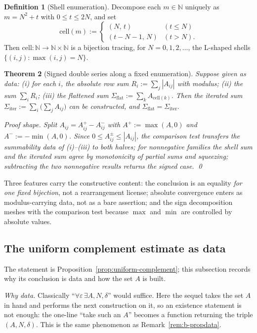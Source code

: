 \documentclass[11pt]{article}
\newtheorem{theorem}{Theorem}[section]
\theoremstyle{definition}
\newtheorem{definition}[theorem]{Definition}
\theoremstyle{remark}
\begin{document}
\begin{definition}[Shell enumeration]
\label{def:b-shell}
Decompose each $m\in\mathbb{N}$ uniquely as $m=N^2+t$ with $0\le t\le 2N$, and set
\[
\mathrm{cell}(m):=\begin{cases}(N,\,t)&(t\le N)\\(t-N-1,\,N)&(t>N).\end{cases}
\]
Then $\mathrm{cell}:\mathbb{N}\to\mathbb{N}\times\mathbb{N}$ is a bijection tracing, for $N=0,1,2,\dots$, the L-shaped shells $\{(i,j):\max(i,j)=N\}$.
\end{definition}

\begin{theorem}[Signed double series along a fixed enumeration]
\label{thm:b-fubini}
Suppose given \emph{as data}: (i) for each $i$, the absolute row sum $R_i:=\sum_j |A_{ij}|$ with modulus; (ii) the sum $\sum_i R_i$; (iii) the flattened sum $\Sigma_{\mathrm{flat}}:=\sum_k A_{\mathrm{cell}(k)}$.  Then the iterated sum $\Sigma_{\mathrm{iter}}:=\sum_i\bigl(\sum_j A_{ij}\bigr)$ can be constructed, and
\(
\Sigma_{\mathrm{flat}}=\Sigma_{\mathrm{iter}} .
\)

\emph{Proof shape.}  Split $A_{ij}=A^+_{ij}-A^-_{ij}$ with $A^+:=\max(A,0)$ and $A^-:=-\min(A,0)$.  Since $0\le A^{\pm}_{ij}\le|A_{ij}|$, the comparison test transfers the summability data of (i)--(iii) to both halves; for nonnegative families the shell sum and the iterated sum agree by monotonicity of partial sums and squeezing; subtracting the two nonnegative results returns the signed case. \qed
\end{theorem}

Three features carry the constructive content: the conclusion is an equality \emph{for one fixed bijection}, not a rearrangement license; absolute convergence enters as modulus-carrying data, not as a bare assertion; and the sign decomposition meshes with the comparison test because $\max$ and $\min$ are controlled by absolute values.

\subsection{The uniform complement estimate as data}
\label{sec:b-uniform}

The statement is Proposition~\ref{prop:uniform-complement}; this subsection records why its conclusion is data and how the set $A$ is built.

\emph{Why data.}  Classically ``$\forall\varepsilon\,\exists A,N,\delta$'' would suffice.  Here the sequel takes the set $A$ in hand and performs the next construction on it, so an existence statement is not enough: the one-line ``take such an $A$'' becomes a function returning the triple $(A,N,\delta)$.  This is the same phenomenon as Remark~\ref{rem:b-propdata}.
\end{document}
